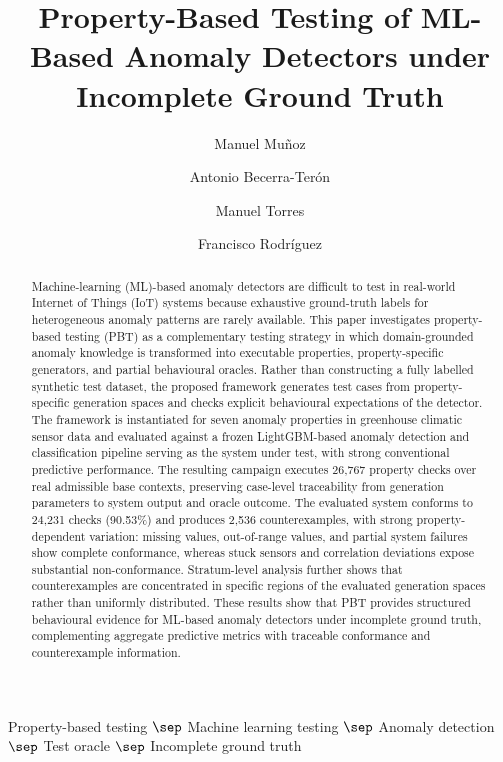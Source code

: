\documentclass[preprint,12pt]{elsarticle}
\begin{document}
\begin{frontmatter}

\title{Property-Based Testing of ML-Based Anomaly Detectors under Incomplete Ground Truth}

\author[inst1]{Manuel Muñoz}

\author[inst1]{Antonio Becerra-Terón}

\author[inst1]{Manuel Torres}

\author[inst1]{Francisco Rodríguez}


\address[inst1]{Department of Informatics, CIESOL-ceiA3,
University of Almería, Carretera de Sacramento s/n,
04120 Almería, Spain}



\begin{abstract}
Machine-learning (ML)-based anomaly detectors are difficult to test in
real-world Internet of Things (IoT) systems because exhaustive ground-truth
labels for heterogeneous anomaly patterns are rarely available. This paper
investigates property-based testing (PBT) as a complementary testing strategy
in which domain-grounded anomaly knowledge is transformed into executable
properties, property-specific generators, and partial behavioural oracles.
Rather than constructing a fully labelled synthetic test dataset, the proposed
framework generates test cases from property-specific generation spaces and
checks explicit behavioural expectations of the detector. The framework is instantiated for seven anomaly properties in greenhouse
climatic sensor data and evaluated against a frozen LightGBM-based anomaly
detection and classification pipeline serving as the system under test, with
strong conventional predictive performance. The resulting campaign executes
26,767 property checks over real admissible base contexts, preserving
case-level traceability from generation parameters to system output and oracle
outcome. The evaluated system conforms to 24,231
checks (90.53\%) and produces 2,536 counterexamples, with strong
property-dependent variation: missing values, out-of-range values, and partial
system failures show complete conformance, whereas stuck sensors and
correlation deviations expose substantial non-conformance. Stratum-level
analysis further shows that counterexamples are concentrated in specific
regions of the evaluated generation spaces rather than uniformly distributed.
These results show that PBT provides structured behavioural evidence for
ML-based anomaly detectors under incomplete ground truth, complementing
aggregate predictive metrics with traceable conformance and counterexample
information.
\end{abstract}

\begin{keyword}
Property-based testing \(\sep\) Machine learning testing \(\sep\) Anomaly detection \(\sep\) Test oracle \(\sep\) Incomplete ground truth
\end{keyword}

\end{frontmatter}
\end{document}
